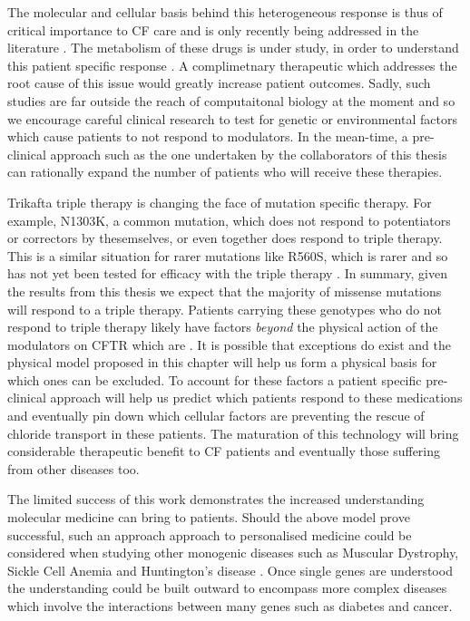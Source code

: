 The molecular and cellular basis behind this heterogeneous response is thus of critical importance to CF care and is only recently being addressed in the literature \cite{}. The metabolism of these drugs is under study, in order to understand this patient specific response \cite{hanafin2021}. A complimetnary therapeutic which addresses the root cause of this issue would greatly increase patient outcomes. Sadly, such studies are far outside the reach of computaitonal biology at the moment and so we encourage careful clinical research to test for genetic or environmental factors which cause patients to not respond to modulators. In the mean-time, a pre-clinical approach such as the one undertaken by the collaborators of this thesis can rationally expand the number of patients who will receive these therapies.

Trikafta triple therapy is changing the face of mutation specific therapy. For example, N1303K, a common mutation, which does not respond to potentiators or correctors by thesemselves, or even together \cite{} does respond to triple therapy. This is a similar situation for rarer mutations like R560S, which is rarer and so has not yet been tested for efficacy with the triple therapy \cite{awatade2019}. In summary, given the results from this thesis we expect that the majority of missense mutations will respond to a triple therapy. Patients carrying these genotypes who do not respond to triple therapy likely have factors \textit{beyond} the physical action of the modulators on CFTR which are . It is possible that exceptions do exist and the physical model proposed in this chapter will help us form a physical basis for which ones can be excluded. To account for these factors a patient specific pre-clinical approach will help us predict which patients respond to these medications and eventually pin down which cellular factors are preventing the rescue of chloride transport in these patients. The maturation of this technology will bring considerable therapeutic benefit to CF patients and eventually those suffering from other diseases too.

The limited success of this work demonstrates the increased understanding molecular medicine can bring to patients. Should the above model prove successful, such an approach approach to personalised medicine could  be considered when studying other monogenic diseases such as Muscular Dystrophy, Sickle Cell Anemia and Huntington's disease \cite{}.  Once single genes are understood the understanding could be built outward to encompass more complex diseases which involve the interactions between many genes such as diabetes and cancer. 

